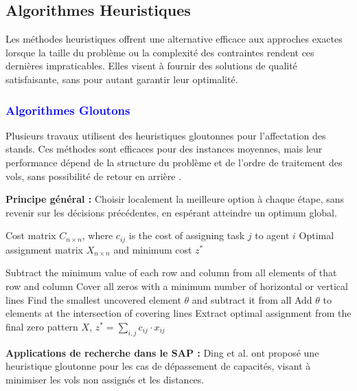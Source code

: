 \vspace{-0.8em}
\subsection*{Algorithmes Heuristiques}

Les méthodes heuristiques offrent une alternative efficace aux approches exactes lorsque la taille du problème ou la complexité des contraintes rendent ces dernières impraticables. Elles visent à fournir des solutions de qualité satisfaisante, sans pour autant garantir leur optimalité.


\subsubsection*{\small{\textcolor{blue}{Algorithmes Gloutons}}}
\label{sec:Greedy}

\vspace{-0.5em}
Plusieurs travaux utilisent des heuristiques gloutonnes pour l’affectation des stands. Ces méthodes sont efficaces pour des instances moyennes, mais leur performance dépend de la structure du problème et de l’ordre de traitement des vols, sans possibilité de retour en arrière \cite{Ding_2004}.


\textbf{Principe général :} Choisir localement la meilleure option à chaque étape, sans revenir sur les décisions précédentes, en espérant atteindre un optimum global.
\begin{algorithm}[H]
	\caption{Hungarian Algorithm for Assignment Problem}
	\label{alg:hungarian}
	\begin{algorithmic}[1]
		\Require Cost matrix $C_{n \times n}$, where $c_{ij}$ is the cost of assigning task $j$ to agent $i$
		\Ensure Optimal assignment matrix $X_{n \times n}$ and minimum cost $z^*$
		
		\State Subtract the minimum value of each row and column from all elements of that row and column
		\Repeat
		\State Cover all zeros with a minimum number of horizontal or vertical lines
		\State Find the smallest uncovered element $\theta$ and subtract it from all
		\State Add $\theta$ to elements at the intersection of covering lines
		\EndIf
		\State Extract optimal assignment from the final zero pattern
		\State \Return $X$, $z^* = \sum_{i,j} c_{ij} \cdot x_{ij}$
	\end{algorithmic}
\end{algorithm}

\vspace{-0.5em}
\textbf{Applications de recherche dans le SAP :}  
Ding et al. \cite{Ding_2004} ont proposé une heuristique gloutonne pour les cas de dépassement de capacités, visant à minimiser les vols non assignés et les distances.


